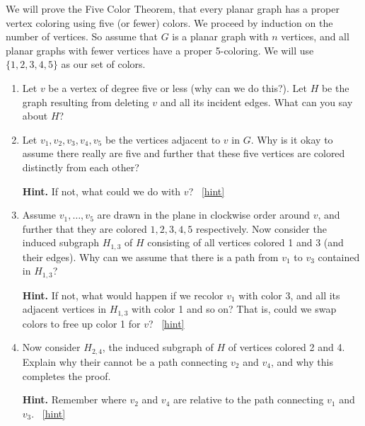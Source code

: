 \documentclass{book}
\begin{document}
\setcounter{project}{39}
\addtocounter{project}{-1}
\begin{activity}[]\label{activity-32}
\hypertarget{p-368}{}%
We will prove the Five Color Theorem, that every planar graph has a proper vertex coloring using five (or fewer) colors.  We proceed by induction on the number of vertices.  So assume that \(G\) is a planar graph with \(n\) vertices, and all planar graphs with fewer vertices have a proper 5-coloring.  We will use \(\{1,2,3,4,5\}\) as our set of colors.%
\begin{enumerate}[font=\bfseries,label=(\alph*),ref=\alph*]
\item\label{task-50} \hypertarget{p-369}{}%
Let \(v\) be a vertex of degree five or less (why can we do this?).  Let \(H\) be the graph resulting from deleting \(v\) and all its incident edges.  What can you say about \(H\)?%
\item\label{task-51} \hypertarget{p-370}{}%
Let \(v_1, v_2, v_3, v_4, v_5\) be the vertices adjacent to \(v\) in \(G\).  Why is it okay to assume there really are five and further that these five vertices are colored distinctly from each other?%
\par\smallskip%
\noindent\textbf{Hint.}\hypertarget{hint-12}{}\quad%
\hypertarget{p-371}{}%
If not, what could we do with \(v\)?%
~\hfill{\tiny\hyperlink{a-39.b}{[hint]}\hypertarget{q-39.b}{}}\item\label{task-52} \hypertarget{p-372}{}%
Assume \(v_1, \ldots, v_5\) are drawn in the plane in clockwise order around \(v\), and further that they are colored \(1,2,3,4,5\) respectively.  Now consider the induced subgraph \(H_{1,3}\) of \(H\) consisting of all vertices colored 1 and 3 (and their edges).  Why can we assume that there is a path from \(v_1\) to \(v_3\) contained in \(H_{1,3}\)?%
\par\smallskip%
\noindent\textbf{Hint.}\hypertarget{hint-13}{}\quad%
\hypertarget{p-373}{}%
If not, what would happen if we recolor \(v_1\) with color 3, and all its adjacent vertices in \(H_{1,3}\) with color 1 and so on?  That is, could we swap colors to free up color 1 for \(v\)?%
~\hfill{\tiny\hyperlink{a-39.c}{[hint]}\hypertarget{q-39.c}{}}\item\label{task-53} \hypertarget{p-374}{}%
Now consider \(H_{2,4}\), the induced subgraph of \(H\) of vertices colored 2 and 4.  Explain why their cannot be a path connecting \(v_2\) and \(v_4\), and why this completes the proof.%
\par\smallskip%
\noindent\textbf{Hint.}\hypertarget{hint-14}{}\quad%
\hypertarget{p-375}{}%
Remember where \(v_2\) and \(v_4\) are relative to the path connecting \(v_1\) and \(v_3\).%
~\hfill{\tiny\hyperlink{a-39.d}{[hint]}\hypertarget{q-39.d}{}}\end{enumerate}
\end{activity}

\clearpage
\end{document}
